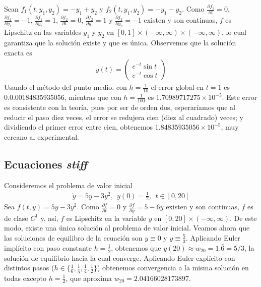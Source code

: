 \documentclass[spanish]{article}
\begin{document}
Sean $f_1(t, y_1, y_2) = -y_1+y_2$ y $f_2(t, y_1, y_2) = -y_1-y_2$. Como $\frac{\partial f_1}{\partial t } = 0$, $\frac{\partial f_1}{\partial y_1 } = -1$, $\frac{\partial f_1}{\partial y_2 } = 1$, $\frac{\partial f_2}{\partial t } = 0$, $\frac{\partial f_2}{\partial y_1 } = 1$ y $\frac{\partial f_2}{\partial y_2 } = -1$ existen y son continuas, $f$ es Lipschitz en las variables $y_1$ y $y_2$ en $[0,1] \times (- \infty, \infty) \times (- \infty, \infty)$, lo cual garantiza que la solución existe y que es única. Observemos que la solución exacta es 
\begin{align*}
y(t) = \begin{pmatrix}
e^{-t}\sin t\\
e^{-t} \cos t
\end{pmatrix}
\end{align*}
Usando el método del punto medio, con $h = \frac{1}{10}$ el error global en $t=1$ es  
0.0.00184835935056, mientras que con $h = \frac{1}{100}$ es $1.70989717275 \times 	
10^{-5}.$ Este error es consistente con la teoría, pues por ser de orden dos,
esperaríamos que al reducir el paso diez veces, el error se redujera cien (diez al 
cuadrado) veces; y dividiendo el primer error entre cien, obtenemos $1.84835935056
\times 10^{-5}$, muy cercano al experimental.



\noindent
\subsection{Ecuaciones \textit{stiff}}
Consideremos el problema de valor inicial
\begin{align*}
\dot{y} = 5y-3y^2, \ \ y(0) = \frac{1}{2}, \ \ t \in [0,20]
\end{align*}
Sea $f(t,y) = 5y-3y^2$. Como $\frac{\partial f}{\partial t} = 0$ y $\frac{\partial f}{\partial y} = 5-6y$ existen y son continuas, $f$ es de clase $C^1$ y, así, $f$ es Lipschitz en la variable $y$ en $[0, 20] \times (- \infty, \infty)$. De este modo, existe una única solución al problema de valor inicial.
Veamos ahora que las soluciones de equilibro de la ecuación son $y \equiv 0$ y 
$y \equiv \frac{5}{3}$.
Aplicando Euler implícito con paso constante $h = \frac{1}{2}$, obtenemos que
$y(20) \approx w_{20} = 1.\bar{6} = 5/3$, la solución de equilibrio hacia
la cual converge.
Aplicando Euler explícito con distintos pasos ($h \in \{\frac{1}{6}, \frac{1}{5}, 
\frac{1}{4}, \frac{1}{2} \}$) obtenemos convergencia a la misma solución en todas
excepto $h = \frac{1}{2}$, que aproxima $w_{20} = 2.04166028173897$.
\end{document}
